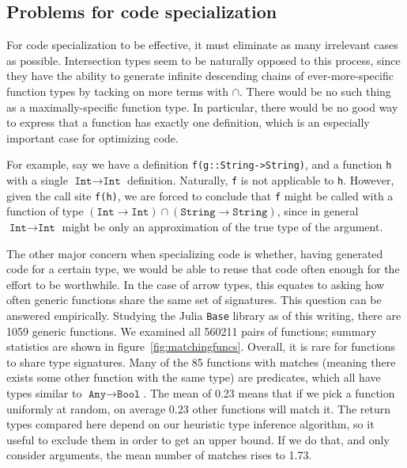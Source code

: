 \subsection{Problems for code specialization}

For code specialization to be effective, it must eliminate as many
irrelevant cases as possible. Intersection types seem to be naturally
opposed to this process, since they have the ability to
generate infinite descending chains of ever-more-specific function
types by tacking on more terms with $\cap$. There would be no such
thing as a maximally-specific function type. In particular, there would
be no good way to express that a function has exactly one definition,
which is an especially important case for optimizing code.

For example, say we have a definition \texttt{f(g::String->String)},
and a function \texttt{h} with a single $\texttt{Int}\rightarrow\texttt{Int}$ definition.
Naturally, \texttt{f} is not applicable to \texttt{h}.
However, given the call site \texttt{f(h)}, we are forced to conclude
that \texttt{f} might be called with a function of type
\mbox{$(\texttt{Int}\rightarrow\texttt{Int})\cap(\texttt{String}\rightarrow\texttt{String})$},
since in general $\texttt{Int}\rightarrow\texttt{Int}$ might be only an
approximation of the true type of the argument.


The other major concern when specializing code is whether, having generated code
for a certain type, we would be able to reuse that code often enough for the
effort to be worthwhile.
In the case of arrow types, this equates to asking how often generic functions
share the same set of signatures.
This question can be answered empirically.
Studying the Julia \texttt{Base} library as of this writing, there are 1059
generic functions. We examined all 560211 pairs of functions; summary
statistics are shown in figure~\ref{fig:matchingfuncs}.
Overall, it is rare for functions to share type signatures.
Many of the 85 functions with matches (meaning there exists some other function
with the same type) are predicates, which all have types similar to
$\texttt{Any}\rightarrow \texttt{Bool}$. The mean of 0.23 means that if we
pick a function uniformly at random, on average 0.23 other functions will
match it.
The return types compared here depend on our heuristic type inference algorithm,
so it useful to exclude them in order to get an upper bound.
If we do that, and only consider arguments, the mean number of matches rises to 1.73.

